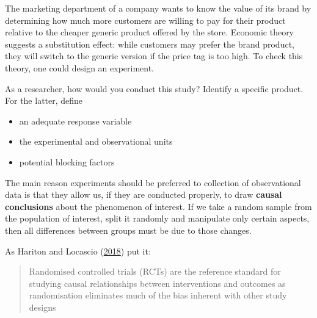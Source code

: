 \documentclass[
  11pt,
  letterpaper,
]{scrbook}
\providecommand{\tightlist}{%
  \setlength{\itemsep}{0pt}\setlength{\parskip}{0pt}}\usepackage{longtable,booktabs,array}
\theoremstyle{definition}
\theoremstyle{remark}
\begin{document}
\begin{tcolorbox}[enhanced jigsaw, breakable, toptitle=1mm, left=2mm, bottomrule=.15mm, colframe=quarto-callout-tip-color-frame, colback=white, rightrule=.15mm, title=\textcolor{quarto-callout-tip-color}{\faLightbulb}\hspace{0.5em}{Your turn}, opacityback=0, toprule=.15mm, titlerule=0mm, colbacktitle=quarto-callout-tip-color!10!white, bottomtitle=1mm, arc=.35mm, coltitle=black, opacitybacktitle=0.6, leftrule=.75mm]

The marketing department of a company wants to know the value of its
brand by determining how much more customers are willing to pay for
their product relative to the cheaper generic product offered by the
store. Economic theory suggests a substitution effect: while customers
may prefer the brand product, they will switch to the generic version if
the price tag is too high. To check this theory, one could design an
experiment.

As a researcher, how would you conduct this study? Identify a specific
product. For the latter, define

\begin{itemize}
\tightlist
\item
  an adequate response variable
\item
  the experimental and observational units
\item
  potential blocking factors
\end{itemize}

\end{tcolorbox}

The main reason experiments should be preferred to collection of
observational data is that they allow us, if they are conducted
properly, to draw \textbf{causal conclusions} about the phenomenon of
interest. If we take a random sample from the population of interest,
split it randomly and manipulate only certain aspects, then all
differences between groups must be due to those changes.

As Hariton and Locascio
(\protect\hyperlink{ref-Hariton.Locascio:2018}{2018}) put it:

\begin{quote}
Randomised controlled trials (RCTs) are the reference standard for
studying causal relationships between interventions and outcomes as
randomisation eliminates much of the bias inherent with other study
designs
\end{quote}
\end{document}
